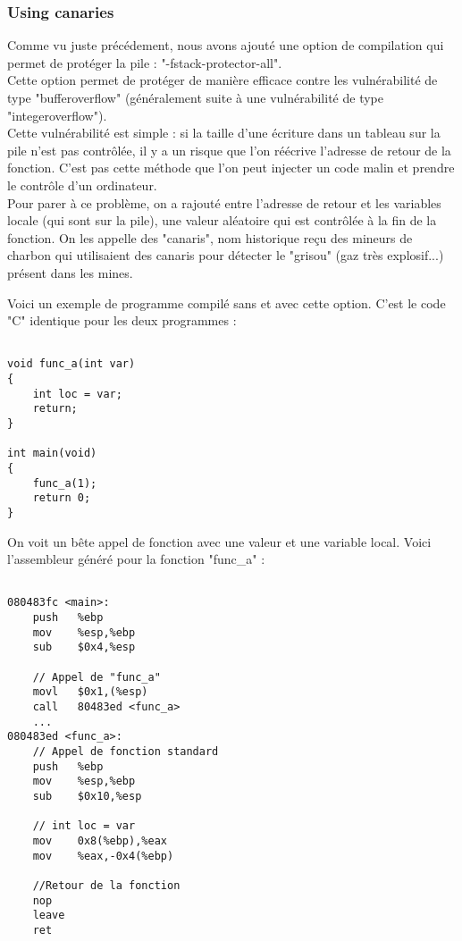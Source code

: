 \subsubsection{Using canaries}
Comme vu juste précédement, nous avons ajouté une option de compilation qui permet de protéger la pile : "-­fstack-­protector-­all". \\
Cette option permet de protéger de manière efficace contre les vulnérabilité de type "bufferoverflow" (généralement suite à une vulnérabilité de type "integeroverflow"). \\

Cette vulnérabilité est simple : si la taille d'une écriture dans un tableau  sur la pile n'est pas contrôlée, il y a un risque que l'on réécrive l'adresse de retour de la fonction. C'est pas cette méthode que l'on peut injecter un code malin et prendre le contrôle d'un ordinateur. \\
Pour parer à ce problème, on a rajouté entre l'adresse de retour et les variables locale (qui sont sur la pile), une valeur aléatoire qui est contrôlée à la fin de la fonction. On les appelle des "canaris", nom historique reçu des mineurs de charbon qui utilisaient des canaris pour détecter le "grisou" (gaz très explosif...) présent dans les mines. 

Voici un exemple de programme compilé sans et avec cette option. C'est le code "C" identique pour les deux programmes :
\begin{lstlisting}[frame=single,style=C]  % Start your code-block

void func_a(int var)
{
	int loc = var;
	return;
}

int main(void)
{
	func_a(1);
	return 0;
}
\end{lstlisting}

On voit un bête appel de fonction avec une valeur et une variable local. Voici l'assembleur généré pour la fonction "func\_a" :
\begin{lstlisting}[frame=single,style=C]  % Start your code-block

080483fc <main>:
	push   %ebp
	mov    %esp,%ebp
	sub    $0x4,%esp
	
	// Appel de "func_a"
	movl   $0x1,(%esp)
	call   80483ed <func_a>
	... 
080483ed <func_a>:
	// Appel de fonction standard
	push   %ebp
	mov    %esp,%ebp
	sub    $0x10,%esp
	
	// int loc = var
	mov    0x8(%ebp),%eax
	mov    %eax,-0x4(%ebp)
	
	//Retour de la fonction
	nop
	leave  
	ret  
\end{lstlisting}

